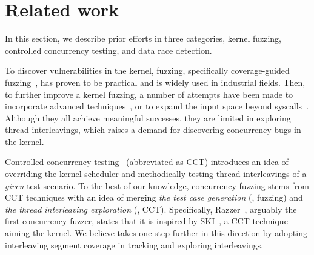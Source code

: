 \section{Related work}
\label{s:relwk}

%
In this section, we describe prior efforts in three categories, kernel
fuzzing, controlled concurrency testing, and data race detection.


%
To discover vulnerabilities in the kernel, fuzzing, specifically
coverage-guided fuzzing~\cite{syzkaller, moonshine, healer, hfl, imf,
  janus, hydra, trinity, kafl, periscope, syzvegas, ksg}, has proven
to be practical and is widely used in industrial fields.
%
%
Then, to further improve a kernel fuzzing, a number of attempts have
been made to incorporate advanced techniques~\cite{moonshine, healer, hfl},
%
or to expand the input space beyond syscalls~\cite{janus, hydra,
  periscope}.
%
Although they all achieve meaningful successes, they are limited in
exploring thread interleavings, which raises a demand for discovering
concurrency bugs in the kernel.







%
Controlled concurrency testing~\cite{ski, pctalgorithm, sparsernr,
  chess, nagarakatte2012multicore, abdelrasoul2017promoting,
  cai2016radius, mukherjee2020learning, schedulebounding} (abbreviated
as CCT) introduces an idea of overriding the kernel scheduler and
methodically testing thread interleavings of a \textit{given} test
scenario.
%
%
To the best of our knowledge, concurrency fuzzing stems from CCT
techniques with an idea of merging \textit{the test case generation}
(\ie, fuzzing) and \textit{the thread interleaving exploration} (\ie,
CCT).
%
Specifically, Razzer~\cite{razzer}, arguably the first concurrency
fuzzer, states that it is inspired by SKI~\cite{ski}, a CCT technique
aiming the kernel.
%
We believe \sys takes one step further in this direction by adopting
interleaving segment coverage in tracking and exploring interleavings.
%
%



